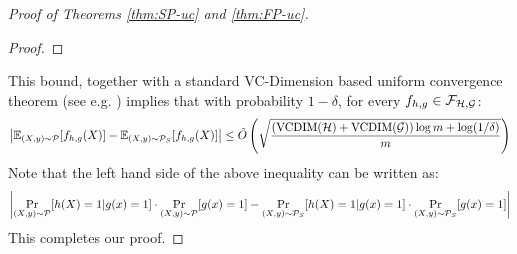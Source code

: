 \begin{proof}[Proof of Theorems \ref{thm:SP-uc} and \ref{thm:FP-uc}]
\begin{proof}
\end{proof}
This bound, together with a standard VC-Dimension based uniform convergence theorem (see e.g. \cite{KV94}) implies that with probability $1-\delta$, for every $f_{h,g} \in \mathcal{F}_{\mathcal{H}, \mathcal{G}}$:
$$\left|\mathbb E_{(X,y) \sim \mathcal{P}}[f_{h,g}(X)] - \mathbb E_{(X,y) \sim \mathcal{P}_S}[f_{h,g}(X)] \right| \leq \tilde{O}\left(\sqrt{\frac{(\mathrm{VCDIM}(\mathcal{H}) + \mathrm{VCDIM}(\mathcal{G}))\log m + \log(1/\delta)}{m}} \right)$$
Note that the left hand side of the above inequality can be written as:
$$\left|\Pr_{(X,y) \sim \mathcal{P}}[h(X) = 1 | g(x) = 1] \cdot \Pr_{(X,y) \sim \mathcal{P}}[g(x) = 1] -  \Pr_{(X,y) \sim \mathcal{P}_S}[h(X) = 1 | g(x) = 1] \cdot \Pr_{(X,y) \sim \mathcal{P}_S}[g(x) = 1] \right|$$
This completes our proof.

\end{proof}

